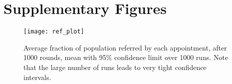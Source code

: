 
\chapter{Supplementary Figures}
\label{app:additional_figures}

\begin{figure}[H]
\texttt{[image: ref\_plot]}
\caption{Average fraction of population referred by each appointment, after 1000 rounds, mean with 95\% confidence limit over 1000 runs. Note that the large number of runs leads to very tight confidence intervals.\label{fig:ref_plot}}
\end{figure}